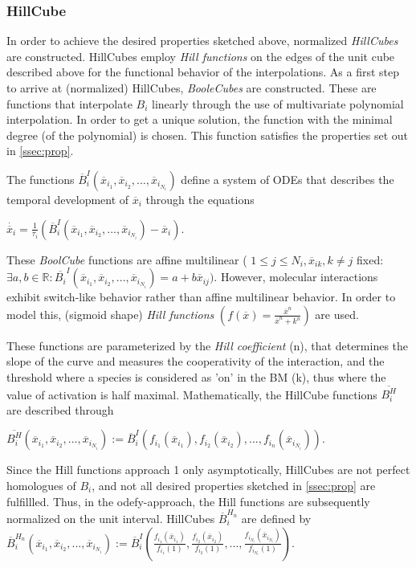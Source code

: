 \documentclass[11pt]{article}
\begin{document}
\subsubsection{HillCube}
In order to achieve the desired properties sketched above, normalized \textit{HillCubes} are constructed. HillCubes employ \textit{Hill functions} on the edges of the unit cube described above for the functional behavior of the interpolations.
As a first step to arrive at (normalized) HillCubes, \textit{BooleCubes} are constructed. These are functions that interpolate $B_{i}$ linearly through the use of multivariate polynomial interpolation. In order to get a unique solution,
the function with the minimal degree (of the polynomial) is chosen. This function satisfies the properties set out in \ref{ssec:prop}.

The functions $\overline{B}_{i}^{I} (\overline{x}_{i_{1}}, \overline{x}_{i_{2}},..., \overline{x}_{i_{N_{i}}} )$ define a system of ODEs that describes the temporal development of $\overline{x}_{i}$ through the equations 

$\dot{\overline{x}_{i}} = \frac{1}{\tau_{i}} (\overline{B}_{i}^{I} (\overline{x}_{i_{1}}, \overline{x}_{i_{2}},..., \overline{x}_{i_{N_{i}}}) - \overline{x}_{i} )$.

These \textit{BoolCube} functions are affine multilinear ( $1 \leq j \leq N_{i} , \overline{x}_{ik}, k \neq j$ fixed: $ \exists a, b \in \mathbb{R} : \overline{B_{i}}^{I} (\overline{x}_{i_{1}}, \overline{x}_{i_{2}},..., \overline{x}_{i_{N_{i}}} ) = a + b \overline{x}_{ij} ).$
However, molecular interactions exhibit switch-like behavior rather than affine multilinear behavior. In order to model this, (sigmoid shape) \textit{Hill functions} $(f(\overline{x}) = \frac{\overline{x}^{n}}{ \overline{x}^{n} + k^{n}} )$ are used.

These functions are parameterized by the \textit{Hill coefficient} (n), that determines the slope of the curve and measures the cooperativity of the interaction, and the threshold where a species is considered as 'on' in the BM (k), thus where the value of activation is half maximal. Mathematically, the HillCube functions $\overline{B_{i}^{H}}$ are described through 

$\overline{B_{i}^{H}} (\overline{x}_{i_{1}}, \overline{x}_{i_{2}},..., \overline{x}_{i_{N_{i}}} ) := \overline{B}_{i}^{I} (f_{i_{1}}(\overline{x}_{i_{1}}), f_{i_{2}} (\overline{x}_{i_{2}}),..., f_{i_{n}} (\overline{x}_{i_{N_{i}}}) )$.

Since the Hill functions approach 1 only asymptotically, HillCubes are not perfect homologues of $B_{i}$, and not all desired properties sketched in \ref{ssec:prop} are fulfillled. Thus, in the odefy-approach, the Hill functions are subsequently normalized on the unit interval. HillCubes $\overline{B}_{i}^{H_{n}}$ are defined by $\overline{B}_{i}^{H_{n}} (\overline{x}_{i_{1}}, \overline{x}_{i_{2}}, ..., \overline{x}_{i_{N_{i}}}) := \overline{B}_{i}^{I} ( \frac{f_{i_{1}}(\overline{x}_{i_1})}{f_{i_{1}} (1)}, \frac{f_{i_{2}}(\overline{x}_{i_2})}{f_{i_{2}} (1)}, ..., \frac{f_{i_{N_{i}}}(\overline{x}_{i_{N_{i}}})}{f_{i_{N_{i}}} (1)})$.
\end{document}
